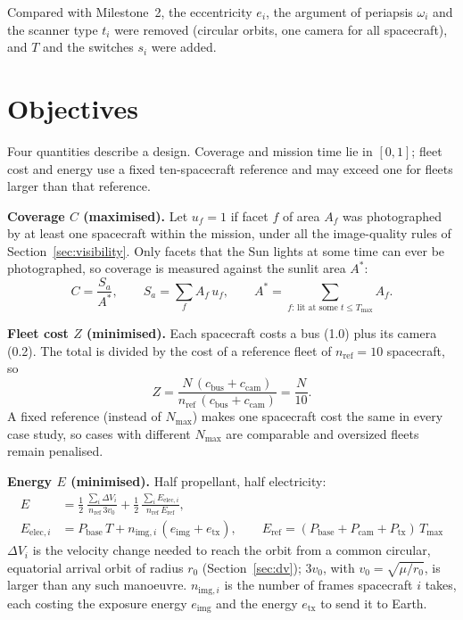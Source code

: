 Compared with Milestone~2, the eccentricity $e_i$, the argument of periapsis $\omega_i$ and
the scanner type $t_i$ were removed (circular orbits, one camera for all spacecraft), and
$T$ and the switches $s_i$ were added.

\section{Objectives}
Four quantities describe a design. Coverage and mission time lie in $[0,1]$; fleet cost and energy
use a fixed ten-spacecraft reference and may exceed one for fleets larger than that reference.

\textbf{Coverage $C$ (maximised).} Let $u_f=1$ if facet $f$ of area $A_f$ was photographed by
at least one spacecraft within the mission, under all the image-quality rules of
Section~\ref{sec:visibility}. Only facets that the Sun lights at some time can ever be
photographed, so coverage is measured against the sunlit area $A^{*}$:
\begin{equation}
C=\frac{S_a}{A^{*}},\qquad S_a=\sum_f A_f\,u_f,\qquad A^{*}=\sum_{f:\,\text{lit at some }t\le T_{\max}}A_f .
\label{eq:C}
\end{equation}

\textbf{Fleet cost $Z$ (minimised).} Each spacecraft costs a bus (1.0) plus its camera (0.2).
The total is divided by the cost of a reference fleet of $n_{\mathrm{ref}}=10$ spacecraft, so
\begin{equation}
Z=\frac{N\,(c_{\mathrm{bus}}+c_{\mathrm{cam}})}{n_{\mathrm{ref}}\,(c_{\mathrm{bus}}+c_{\mathrm{cam}})}=\frac{N}{10}.
\label{eq:Z}
\end{equation}
A fixed reference (instead of $N_{\max}$) makes one spacecraft cost the same in every case
study, so cases with different $N_{\max}$ are comparable and oversized fleets remain penalised.

\textbf{Energy $E$ (minimised).} Half propellant, half electricity:
\begin{align}
E&=\tfrac12\,\frac{\sum_i\Delta V_i}{n_{\mathrm{ref}}\,3v_0}
 +\tfrac12\,\frac{\sum_i E_{\mathrm{elec},i}}{n_{\mathrm{ref}}\,E_{\mathrm{ref}}},\label{eq:E}\\
E_{\mathrm{elec},i}&=P_{\mathrm{base}}\,T+n_{\mathrm{img},i}\,(e_{\mathrm{img}}+e_{\mathrm{tx}}),\qquad
E_{\mathrm{ref}}=(P_{\mathrm{base}}+P_{\mathrm{cam}}+P_{\mathrm{tx}})\,T_{\max}\nonumber
\end{align}
$\Delta V_i$ is the velocity change needed to reach the orbit from a common circular,
equatorial arrival orbit of radius $r_0$ (Section~\ref{sec:dv}); $3v_0$, with
$v_0=\sqrt{\mu/r_0}$, is larger than any such manoeuvre. $n_{\mathrm{img},i}$ is the number of
frames spacecraft $i$ takes, each costing the exposure energy $e_{\mathrm{img}}$ and the
energy $e_{\mathrm{tx}}$ to send it to Earth.

